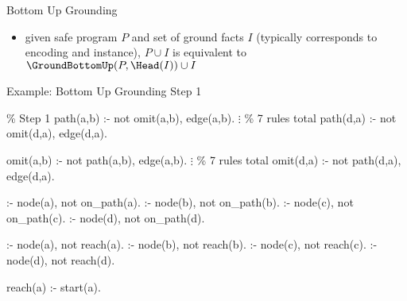 \begin{frame}{Bottom Up Grounding}
  \begin{itemize}
    \item given safe program \(P\) and set of ground facts \(I\) (typically corresponds to encoding and instance), \(P \cup I\) is equivalent to \(\GroundBottomUp(P,\Head(I)) \cup I\)
  \end{itemize}
\end{frame}

\begin{frame}[fragile]{Example: Bottom Up Grounding Step 1}
  \vfill
\begin{SemiVerbatim}[\small]{.9}
{\color{comment}\% Step 1}
path(a,b) :- not omit(a,b), \alert{edge(a,b)}.
          \(\vdots\) {\color{comment}\% 7 rules total}
path(d,a) :- not omit(d,a), \alert{edge(d,a)}.

omit(a,b) :- not path(a,b), \alert{edge(a,b)}.
          \(\vdots\) {\color{comment}\% 7 rules total}
omit(d,a) :- not path(d,a), \alert{edge(d,a)}.

:- \alert{node(a)}, not on_path(a).  :- \alert{node(b)}, not on_path(b).
:- \alert{node(c)}, not on_path(c).  :- \alert{node(d)}, not on_path(d).

:- \alert{node(a)}, not reach(a).  :- \alert{node(b)}, not reach(b).
:- \alert{node(c)}, not reach(c).  :- \alert{node(d)}, not reach(d).

reach(a) :- \alert{start(a)}.
\end{SemiVerbatim}
\end{frame}


